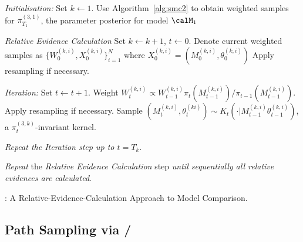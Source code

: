 \begin{algorithm}
\begin{algorithmic}
  \tophrule
  \STATE \emph{Initialisation:} Set $k\leftarrow1$.
  \STATE\STATESKIP Use Algorithm~\ref{alg:smc2} to obtain weighted samples
  for $\pi_{T_1}^{(3,1)}$, the parameter posterior for model $\calM_1$

  \STATE \emph{Relative Evidence Calculation}
  \STATE\STATESKIP Set $k\leftarrow k + 1$, $t\leftarrow0$.
  \STATE\STATESKIP Denote current weighted samples as
  $\{W_0^{(k,i)},X_0^{(k,i)}\}_{i=1}^N$ where $X_0^{(k,i)} =
  (M_0^{(k,i)},\theta_0^{(k,i)})$
  \STATE\STATESKIP Apply resampling if necessary.

  \STATE\STATESKIP \emph{Iteration:} Set $t\leftarrow t + 1$.
  \STATE\STATESKIP\STATESKIP Weight $W_t^{(k,i)} \propto W_{t-1}^{(k,i)}
  {\pi_t(M_{t-1}^{(k,i)})}/{\pi_{t-1}(M_{t-1}^{(k,i)})}$.
  \STATE\STATESKIP\STATESKIP Apply resampling if necessary.
  \STATE\STATESKIP\STATESKIP Sample $(M_t^{(k,i)},\theta_t^{(ki)}) \sim
  K_t(\cdot|M_{t-1}^{(k,i)}\theta_{t-1}^{(k,i)})$, a $\pi_t^{(3,k)}$-invariant
  kernel.

  \STATE\STATESKIP \emph{Repeat the \emph{Iteration} step up to $t = T_k$}.

  \STATE \emph{Repeat} the \emph{Relative Evidence Calculation} step \emph{until
    sequentially all relative evidences are calculated}.
  \bottomhrule
\end{algorithmic}
\caption{\smc[3]: A Relative-Evidence-Calculation Approach to Model Comparison.}
\label{alg:smc3}
\end{algorithm}

\subsection{Path Sampling via \smc[2]/\smc[3]}
\label{sub:Path Sampling via smc2/smc3}

